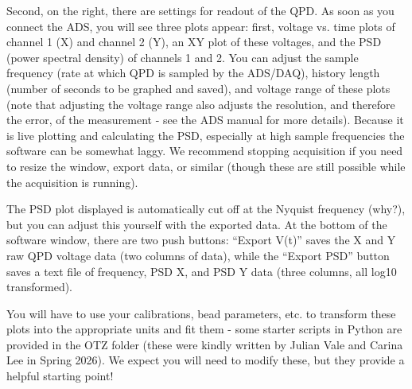\documentclass{../lab}
\begin{document}
Second, on the right, there are settings for readout of the QPD. As soon as you connect the ADS, you will see three plots appear: first, voltage vs. time plots of channel 1 (X) and channel 2 (Y), an XY plot of these voltages, and the PSD (power spectral density) of channels 1 and 2. You can adjust the sample frequency (rate at which QPD is sampled by the ADS/DAQ), history length (number of seconds to be graphed and saved), and voltage range of these plots (note that adjusting the voltage range also adjusts the resolution, and therefore the error, of the measurement - see the ADS manual for more details). Because it is live plotting and calculating the PSD, especially at high sample frequencies the software can be somewhat laggy. We recommend stopping acquisition if you need to resize the window, export data, or similar (though these are still possible while the acquisition is running).

The PSD plot displayed is automatically cut off at the Nyquist frequency (why?), but you can adjust this yourself with the exported data. At the bottom of the software window, there are two push buttons: ``Export V(t)'' saves the X and Y raw QPD voltage data (two columns of data), while the ``Export PSD'' button saves a text file of frequency, PSD X, and PSD Y data (three columns, all log10 transformed).

You will have to use your calibrations, bead parameters, etc. to transform these plots into the appropriate units and fit them - some starter scripts in Python are provided in the OTZ folder (these were kindly written by Julian Vale and Carina Lee in Spring 2026). We expect you will need to modify these, but they provide a helpful starting point!


\end{document}
